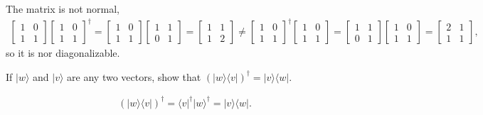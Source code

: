 \documentclass[en]{sol-man}
\begin{document}
\begin{pf}
    The matrix is not normal,
    \begin{align}
        \left[\begin{matrix}
            1&0\\
            1&1
        \end{matrix}\right]\left[\begin{matrix}
            1&0\\
            1&1
        \end{matrix}\right]^{\dagger}=\left[\begin{matrix}
            1&0\\
            1&1
        \end{matrix}\right]\left[\begin{matrix}
            1&1\\
            0&1
        \end{matrix}\right]=\left[\begin{matrix}
            1&1\\
            1&2
        \end{matrix}\right]\neq\left[\begin{matrix}
            1&0\\
            1&1
        \end{matrix}\right]^{\dagger}\left[\begin{matrix}
            1&0\\
            1&1
        \end{matrix}\right]=\left[\begin{matrix}
            1&1\\
            0&1
        \end{matrix}\right]\left[\begin{matrix}
            1&0\\
            1&1
        \end{matrix}\right]=\left[\begin{matrix}
            2&1\\
            1&1
        \end{matrix}\right],
    \end{align}
    so it is nor diagonalizable.
\end{pf}

\begin{exe}
    If $\lvert w\rangle$ and $\lvert v\rangle$ are any two vectors, show that $(\lvert w\rangle\langle v\rvert)^{\dagger}=\lvert v\rangle\langle w\rvert$.
\end{exe}
\begin{pf}
    \begin{align}
        (\lvert w\rangle\langle v\rvert)^{\dagger}=\langle v\rvert^{\dagger}\lvert w\rangle^{\dagger}=\lvert v\rangle\langle w\rvert.
    \end{align}
\end{pf}
\end{document}
